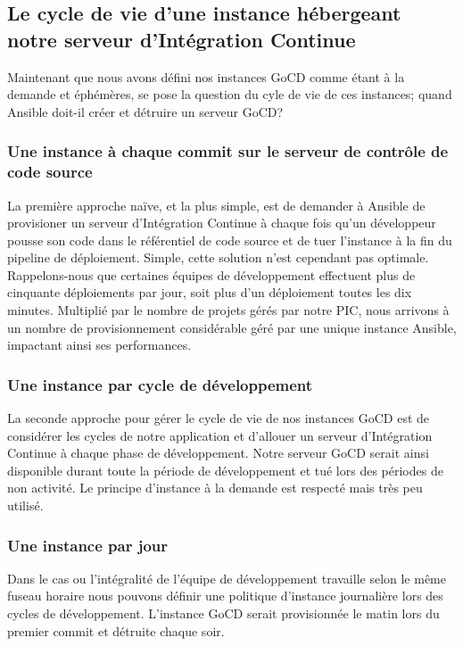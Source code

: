         \subsection{Le cycle de vie d'une instance hébergeant notre serveur d'Intégration Continue}
        Maintenant que nous avons défini nos instances GoCD comme étant à la demande et éphémères, se pose la question du cyle de vie de ces instances; quand Ansible doit-il créer et détruire un serveur GoCD?\\

          \subsubsection{Une instance à chaque commit sur le serveur de contrôle de code source}
          La première approche naïve, et la plus simple, est de demander à Ansible de provisioner un serveur d'Intégration Continue à chaque fois qu'un développeur pousse son code dans le référentiel de code source et de tuer l'instance à la fin du pipeline de déploiement. Simple, cette solution n'est cependant pas optimale. Rappelons-nous que certaines équipes de développement effectuent plus de cinquante déploiements par jour, soit plus d'un déploiement toutes les dix minutes. Multiplié par le nombre de projets gérés par notre PIC, nous arrivons à un nombre de provisionnement considérable géré par une unique instance Ansible, impactant ainsi ses performances.

          \subsubsection{Une instance par cycle de développement}
          La seconde approche pour gérer le cycle de vie de nos instances GoCD est de considérer les cycles de notre application et d'allouer un serveur d'Intégration Continue à chaque phase de développement. Notre serveur GoCD serait ainsi disponible durant toute la période de développement et tué lors des périodes de non activité. Le principe d'instance à la demande est respecté mais très peu utilisé.

          \subsubsection{Une instance par jour}
          Dans le cas ou l'intégralité de l'équipe de développement travaille selon le même fuseau horaire nous pouvons définir une politique d'instance journalière lors des cycles de développement. L'instance GoCD serait provisionnée le matin lors du premier commit et détruite chaque soir.

